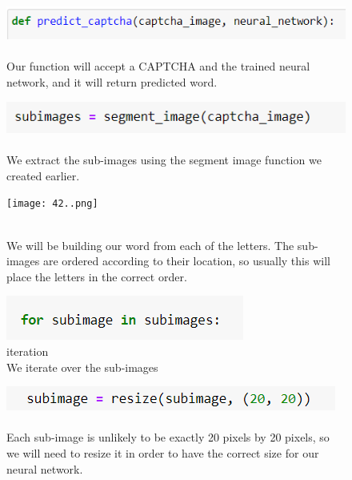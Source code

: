 \documentclass[onecolumn]{article}
\begin{document}
\begin{figure}[h]
    \centering
    \includegraphics[width=.6\linewidth]{40..png}
\caption{\label{fig:demo-bad}
\centering
\\Our function will accept a CAPTCHA and the trained neural network, and it will return  predicted word.}
\end{figure}

\begin{figure}[hb!]
    \centering
    \includegraphics[width=.6\linewidth]{41..png}
\caption{\label{fig:demo-bad}
\centering
\\We extract the sub-images using the segment image function we created earlier.}
\end{figure}

\begin{figure}[hb!]
    \centering
    \texttt{[image: 42..png]}
\caption{\label{fig:demo-bad}
\centering
\\We will be building our word from each of the letters. The sub-images are ordered
according to their location, so usually this will place the letters in the correct order.}
\end{figure}

\newpage


\begin{figure}[h]
    \centering
    \includegraphics[width=.3\linewidth]{43..png}
\caption{\label{fig:demo-bad}
\centering
iteration\\We iterate over the sub-images}
\end{figure}

\begin{figure}[h]
    \centering
    \includegraphics[width=.5\linewidth]{44..png}
\caption{\label{fig:demo-bad}
\centering
\\Each sub-image is unlikely to be exactly 20 pixels by 20 pixels, so we will need to resize it in order to have the correct size for our neural network.}
\end{figure}
\end{document}
